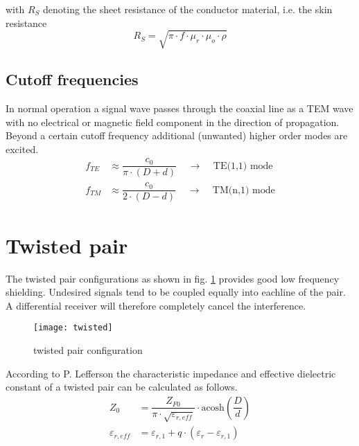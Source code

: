 with $R_S$ denoting the sheet resistance of the conductor material,
i.e. the skin resistance
\begin{equation}
R_S = \sqrt{\pi\cdot f\cdot \mu_r \cdot \mu_o \cdot \rho}
\end{equation}

\subsection{Cutoff frequencies}

In normal operation a signal wave passes through the coaxial line as a
TEM wave with no electrical or magnetic field component in the
direction of propagation.  Beyond a certain cutoff frequency
additional (unwanted) higher order modes are excited.
\begin{align}
f_{TE} &\approx \dfrac{c_0}{\pi\cdot\left(D + d\right)}
\;\;\;\;\rightarrow\;\;\;\; \textrm{TE(1,1) mode}\\
f_{TM} &\approx \dfrac{c_0}{2\cdot\left(D - d\right)}
\;\;\;\;\rightarrow\;\;\;\; \textrm{TM(n,1) mode}
\end{align}

\section{Twisted pair}

The twisted pair configurations as shown in fig. \ref{fig:twisted}
provides good low frequency shielding.  Undesired signals tend to be
coupled equally into eachline of the pair.  A differential receiver
will therefore completely cancel the interference.

\begin{figure}[ht]
\begin{center}
\texttt{[image: twisted]}
\end{center}
\caption{twisted pair configuration}
\label{fig:twisted}
\end{figure}
\FloatBarrier

According to P. Lefferson \cite{Lefferson} the characteristic
impedance and effective dielectric constant of a twisted pair can be
calculated as follows.
\begin{align}
Z_0 &= \dfrac{Z_{F0}}{\pi\cdot\sqrt{\varepsilon_{r,eff}}}\cdot\textrm{acosh}\left(\dfrac{D}{d}\right)\\
\label{eq:TPereff}
\varepsilon_{r,eff} &= \varepsilon_{r,1} + q\cdot\left(\varepsilon_r - \varepsilon_{r,1}\right)
\end{align}

